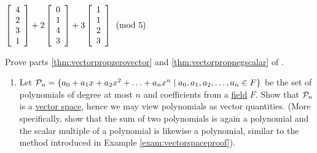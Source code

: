 \begin{enumerate}[!HW!]
\begin{multicols}{2}
\item \label{exer:linearcomborealstop} $\vr{4\\2\\3\\1} + 2\vr{0\\1\\4\\3} + 3\vr{1\\1\\2\\3}\pmod5$\ %
\end{multicols}
\end{enumerate}

\begin{enumerate}[!HW!]
\itemspade Prove parts \ref{thm:vectorpropzerovector} and \ref{thm:vectorpropnegscalar} of .
\end{enumerate}
\begin{enumerate}[!HW!, label=$\spadesuit$ \arabic*., ref=\arabic*]
\item\label{exer:polynomialspace} Let $\P_n =\{a_0 + a_1x + a_2x^2 + \ldots + a_nx^n \mid a_0, a_1, a_2,\ldots, a_n\in F\}$ be the set of polynomials of degree at most $n$ and coefficients from a \hyperref[def:field]{field} $F$. Show that $\P_n$ is a \hyperref[def:vectorspace]{vector space}, hence we may view polynomials as vector quantities. (More specifically, show that the sum of two polynomials is again a polynomial and the scalar multiple of a polynomial is likewise a polynomial, similar to the method introduced in Example \ref{exam:vectorspaceproof}).
\end{enumerate}

